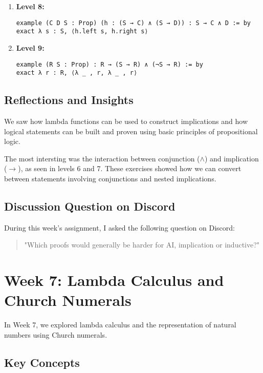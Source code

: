 \documentclass{article}
\begin{document}
\begin{enumerate}
    \item \textbf{Level 8:}
    \begin{lstlisting}[style=leanstyle]
example (C D S : Prop) (h : (S → C) ∧ (S → D)) : S → C ∧ D := by
exact λ s : S, ⟨h.left s, h.right s⟩
    \end{lstlisting}

    \item \textbf{Level 9:}
    \begin{lstlisting}[style=leanstyle]
example (R S : Prop) : R → (S → R) ∧ (¬S → R) := by
exact λ r : R, ⟨λ _ , r, λ _ , r⟩
    \end{lstlisting}
\end{enumerate}

\subsection*{Reflections and Insights}

We saw how lambda functions can be used to construct implications and how logical statements can be built and proven using basic principles of propositional logic.

The most intersting was the interaction between conjunction (\(\land\)) and implication (\(\rightarrow\)), as seen in levels 6 and 7. These exercises showed how we can convert between statements involving conjunctions and nested implications.
\subsection*{Discussion Question on Discord}

During this week's assignment, I asked the following question on Discord:

\begin{quote}
\small
"Which proofs would generally be harder for AI, implication or inductive?"
\end{quote}

\section{Week 7: Lambda Calculus and Church Numerals}
\label{sec:week7}

In Week 7, we explored lambda calculus and the representation of natural numbers using Church numerals.

\subsection*{Key Concepts}
\end{document}
